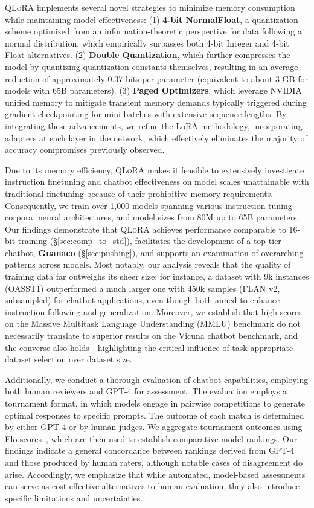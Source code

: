 \textsc{QLoRA} implements several novel strategies to minimize memory consumption while maintaining model effectiveness: (1) \textbf{4-bit NormalFloat}, a quantization scheme optimized from an information-theoretic perspective for data following a normal distribution, which empirically surpasses both 4-bit Integer and 4-bit Float alternatives. (2) \textbf{Double Quantization}, which further compresses the model by quantizing quantization constants themselves, resulting in an average reduction of approximately 0.37 bits per parameter (equivalent to about 3 GB for models with 65B parameters). (3) \textbf{Paged Optimizers}, which leverage NVIDIA unified memory to mitigate transient memory demands typically triggered during gradient checkpointing for mini-batches with extensive sequence lengths. By integrating these advancements, we refine the LoRA methodology, incorporating adapters at each layer in the network, which effectively eliminates the majority of accuracy compromises previously observed.

Due to its memory efficiency, \textsc{QLoRA} makes it feasible to extensively investigate instruction finetuning and chatbot effectiveness on model scales unattainable with traditional finetuning because of their prohibitive memory requirements. Consequently, we train over 1,000 models spanning various instruction tuning corpora, neural architectures, and model sizes from 80M up to 65B parameters. Our findings demonstrate that \textsc{QLoRA} achieves performance comparable to 16-bit training (\S\ref{sec:comp_to_std}), facilitates the development of a top-tier chatbot, \textbf{Guanaco} (\S\ref{sec:pushing}), and supports an examination of overarching patterns across models. Most notably, our analysis reveals that the quality of training data far outweighs its sheer size; for instance, a dataset with 9k instances (OASST1) outperformed a much larger one with 450k samples (FLAN v2, subsampled) for chatbot applications, even though both aimed to enhance instruction following and generalization. Moreover, we establish that high scores on the Massive Multitask Language Understanding (MMLU) benchmark do not necessarily translate to superior results on the Vicuna chatbot benchmark, and the converse also holds—highlighting the critical influence of task-appropriate dataset selection over dataset size.

Additionally, we conduct a thorough evaluation of chatbot capabilities, employing both human reviewers and GPT-4 for assessment. The evaluation employs a tournament format, in which models engage in pairwise competitions to generate optimal responses to specific prompts. The outcome of each match is determined by either GPT-4 or by human judges. We aggregate tournament outcomes using Elo scores~\citep{elo1967proposed, elo1978rating}, which are then used to establish comparative model rankings. Our findings indicate a general concordance between rankings derived from GPT-4 and those produced by human raters, although notable cases of disagreement do arise. Accordingly, we emphasize that while automated, model-based assessments can serve as cost-effective alternatives to human evaluation, they also introduce specific limitations and uncertainties.

